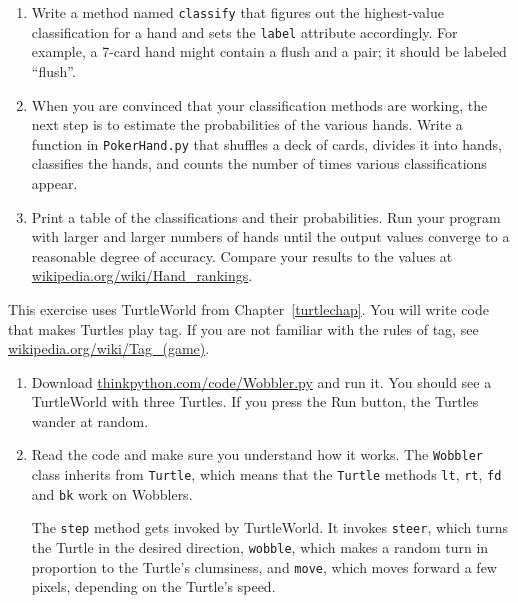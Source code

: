 \documentclass[10pt]{book}
\begin{document}
{\begin{ex}
\begin{enumerate}
\item Write a method named {\tt classify} that figures out
the highest-value classification for a hand and sets the
{\tt label} attribute accordingly.  For example, a 7-card hand
might contain a flush and a pair; it should be labeled ``flush''.

\item When you are convinced that your classification methods are
working, the next step is to estimate the probabilities of the various
hands.  Write a function in {\tt PokerHand.py} that shuffles a deck of
cards, divides it into hands, classifies the hands, and counts the
number of times various classifications appear.

\item Print a table of the classifications and their probabilities.
Run your program with larger and larger numbers of hands until the
output values converge to a reasonable degree of accuracy.  Compare
your results to the values at \url{wikipedia.org/wiki/Hand_rankings}.

\end{enumerate}
\end{ex}


\begin{ex}


This exercise uses TurtleWorld from Chapter~\ref{turtlechap}.
You will write code that makes Turtles play tag.  If you
are not familiar with the rules of tag, see
\url{wikipedia.org/wiki/Tag_(game)}.

\begin{enumerate}

\item Download \url{thinkpython.com/code/Wobbler.py} and run it.  You
should see a TurtleWorld with three Turtles.  If you press the
{\sf Run} button, the Turtles wander at random.

\item Read the code and make sure you understand how it works.
The {\tt Wobbler} class inherits from {\tt Turtle}, which means
that the {\tt Turtle} methods {\tt lt}, {\tt rt}, {\tt fd}
and {\tt bk} work on Wobblers.

The {\tt step} method gets invoked by TurtleWorld.  It invokes 
{\tt steer}, which turns the Turtle in the desired direction,
{\tt wobble}, which makes a random turn in proportion to the Turtle's
clumsiness, and {\tt move}, which moves forward a few pixels,
depending on the Turtle's speed.


\end{enumerate}
\end{ex}}
\end{document}
